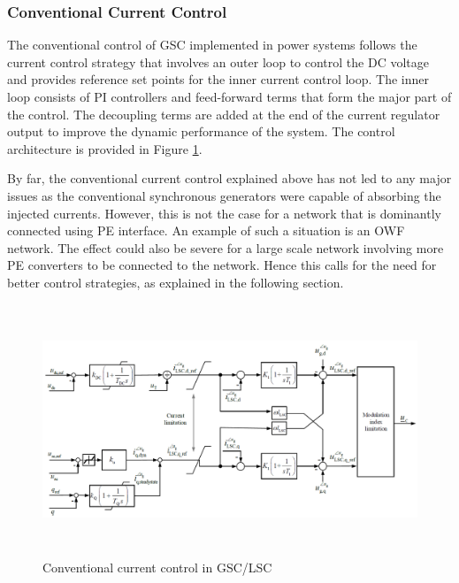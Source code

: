 \subsubsection{Conventional Current Control}\label{conv_current_control}
The conventional control of \gls{GSC} implemented in power systems follows the current control strategy that involves an outer loop to control the \gls{DC} voltage and provides reference set points for the inner current control loop. The inner loop consists of \gls{PI} controllers and feed-forward terms that form the major part of the control. The decoupling terms are added at the end of the current regulator output to improve the dynamic performance of the system. The control architecture is provided in Figure \ref{fig:Diss_GSC_control}.  

By far, the conventional current control explained above has not led to any major issues as the conventional synchronous generators were capable of absorbing the injected currents. However, this is not the case for a network that is dominantly connected using \gls{PE} interface. An example of such a situation is an \gls{OWF} network. The effect could also be severe for a large scale network involving more \gls{PE} converters to be connected to the network. Hence this calls for the need for better control strategies, as explained in the following section.

\begin{figure}[H]
\centering
    \includegraphics[height = 7.5cm,width = 16.5cm]{Diagrams/Chapter_2/Diss_GSC_control.PNG}
    \caption{Conventional current control in GSC/LSC \cite{korai_dynamic_2019}}
    \label{fig:Diss_GSC_control}
\end{figure}



